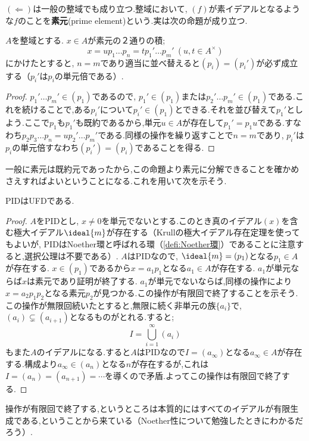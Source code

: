 $(\Longleftarrow)$は一般の整域でも成り立つ.整域において, $(f)$が素イデアルとなるような$f$のことを\textbf{素元}(prime element)という.実は次の命題が成り立つ.

\begin{prop}
	$A$を整域とする. $x\in A$が素元の２通りの積;
	\[x=up_1\dots p_n=tp_1'\dots p_m'~(u,t\in A^\times)\]
	にかけたとすると, $n=m$であり適当に並べ替えると$(p_i)=(p_i')$が必ず成立する（$p_i'$は$p_i$の単元倍である）.
\end{prop}

\begin{proof}
	$p_1'\dots p_m'\in (p_1)$であるので, $p_1'\in (p_1)$または$p_2'\dots p_m'\in (p_1)$である.これを続けることで,ある$p_i'$について$p_i'\in (p_1)$とできる.それを並び替えて$p_1'$としよう.ここで$p_1$も$p_1'$も既約であるから,単元$u\in A$が存在して$p_1'=p_1u$である.すなわち$p_2p_3\dots p_n=up_2'\dots p_m'$である.同様の操作を繰り返すことで$n=m$であり, $p_i'$は$p_i$の単元倍すなわち$(p_i')=(p_i)$であることを得る.
\end{proof}

一般に素元は既約元であったから,この命題より素元に分解できることを確かめさえすればよいということになる.これを用いて次を示そう.
\begin{thm}
	PIDはUFDである.
\end{thm}

\begin{proof}
	$A$をPIDとし, $x\neq0$を単元でないとする.このとき真のイデアル$(x)$を含む極大イデアル$\ideal{m}$が存在する（Krullの極大イデアル存在定理を使ってもよいが, PIDはNoether環と呼ばれる環（\ref{defi:Noether環}）であることに注意すると,選択公理は不要である）. $A$はPIDなので, $\ideal{m}=(p_1)$となる$p_1\in A$が存在する. $x\in(p_1)$であるから$x=a_1p_1$となる$a_1\in A$が存在する. $a_1$が単元ならば$x$は素元であり証明が終了する. $a_1$が単元でないならば,同様の操作により$x=a_2p_1p_2$となる素元$p_2$が見つかる.この操作が有限回で終了することを示そう.この操作が無限回続いたとすると,無限に続く非単元の族$\{a_i\}$で, $(a_i)\subsetneq (a_{i+1})$となるものがとれる.すると;
	\[I=\bigcup_{i=1}^\infty (a_i)\]
	もまた$A$のイデアルになる.すると$A$はPIDなので$I=(a_\infty)$となる$a_\infty\in A$が存在する.構成より$a_\infty\in (a_n)$となる$n$が存在するが,これは$I=(a_n)=(a_{n+1})=\cdots$を導くので矛盾.よってこの操作は有限回で終了する.
\end{proof}

操作が有限回で終了する,というところは本質的にはすべてのイデアルが有限生成である,ということから来ている（Noether性について勉強したときにわかるだろう）.

